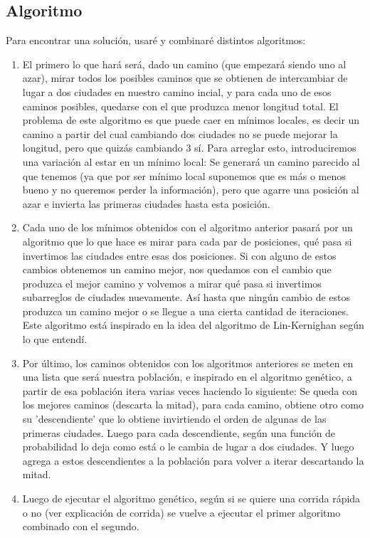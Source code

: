 \documentclass{article}
\begin{document}
\subsection{Algoritmo}

Para encontrar una solución, usaré y combinaré distintos algoritmos:

\begin{enumerate}
    \item El primero lo que hará será, dado un camino (que empezará siendo uno al azar), mirar todos los posibles caminos que se obtienen de intercambiar de lugar a dos ciudades en nuestro camino incial, y para cada uno de esos caminos posibles, quedarse con el que produzca menor longitud total. El problema de este algoritmo es que puede caer en mínimos locales, es decir un camino a partir del cual cambiando dos ciudades no se puede mejorar la longitud, pero que quizás cambiando 3 sí. Para arreglar esto, introduciremos una variación al estar en un mínimo local: Se generará un camino parecido al que tenemos (ya que por ser mínimo local suponemos que es más o menos bueno y no queremos perder la información), pero que agarre una posición al azar e invierta las primeras ciudades hasta esta posición.
    \item Cada uno de los mínimos obtenidos con el algoritmo anterior pasará por un algoritmo que lo que hace es mirar para cada par de posiciones, qué pasa si invertimos las ciudades entre esas dos posiciones. Si con alguno de estos cambios obtenemos un camino mejor, nos quedamos con el cambio que produzca el mejor camino y volvemos a mirar qué pasa si invertimos subarreglos de ciudades nuevamente. Así hasta que ningún cambio de estos produzca un camino mejor o se llegue a una cierta cantidad de iteraciones. Este algoritmo está inspirado en la idea del algoritmo de Lin-Kernighan según lo que entendí.
    \item Por último, los caminos obtenidos con los algoritmos anteriores se meten en una lista que será nuestra población, e inspirado en el algoritmo genético, a partir de esa población itera varias veces haciendo lo siguiente: Se queda con los mejores caminos (descarta la mitad), para cada camino, obtiene otro como su 'descendiente' que lo obtiene invirtiendo el orden de algunas de las primeras ciudades. Luego para cada descendiente, según una función de probabilidad lo deja como está o le cambia de lugar a dos ciudades. Y luego agrega a estos descendientes a la población para volver a iterar descartando la mitad.
    \item Luego de ejecutar el algoritmo genético, según si se quiere una corrida rápida o no (ver explicación de corrida) se vuelve a ejecutar el primer algoritmo combinado con el segundo.
\end{enumerate} 
\end{document}
